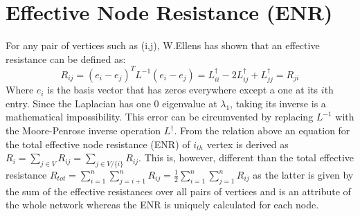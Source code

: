 \documentclass{article}
\begin{document}
	\section{Effective Node Resistance (ENR)}
	For any pair of vertices such as (i,j), W.Ellens \cite{ellens2013graph} has shown that an effective resistance can be defined as:
	\begin{equation}
		R_{ij} = (e_i-e_j)^T  L^{-1} (e_i-e_j) = L_{ii}^{\dag} -2L_{ij}^{\dag} + L_{jj}^{\dag}= R_{ji}
	\end{equation}
	Where $e_i$ is the basis vector that has zeros everywhere except a one at its $i$th entry. Since the Laplacian has one 0 eigenvalue at $\lambda_1$, taking its inverse is a mathematical impossibility. This error can be circumvented by replacing $L^{-1}$ with the Moore-Penrose inverse operation $L^\dag$. From the relation above an equation for the total effective node resistance (ENR) of $i_{th}$ vertex is derived as $R_i = \sum_{j\in V}R_{ij} = \sum_{j\in V/ \{i\}} R_{ij}$. This is, however, different than the total effective resistance $R_{tot}= \sum_{i=1}^{n}\sum_{j=i+1}^{n}R_{ij} = \frac{1}{2}\sum_{i=1}^{n}\sum_{j=1}^{n}R_{ij}$ as the latter is given by the sum of the effective resistances over
	all pairs of vertices and is an attribute of the whole network whereas the ENR is uniquely calculated for each node.
	
\end{document}

